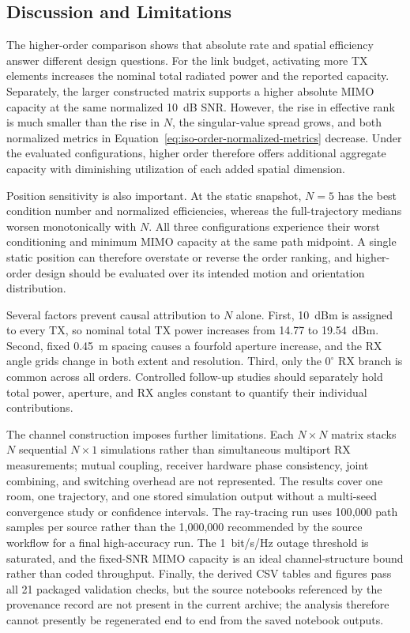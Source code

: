 \subsection{Discussion and Limitations}

The higher-order comparison shows that absolute rate and spatial efficiency answer different design questions. For the link budget, activating more TX elements increases the nominal total radiated power and the reported capacity. Separately, the larger constructed matrix supports a higher absolute MIMO capacity at the same normalized 10~dB SNR. However, the rise in effective rank is much smaller than the rise in $N$, the singular-value spread grows, and both normalized metrics in Equation~\ref{eq:iso-order-normalized-metrics} decrease. Under the evaluated configurations, higher order therefore offers additional aggregate capacity with diminishing utilization of each added spatial dimension.

Position sensitivity is also important. At the static snapshot, $N=5$ has the best condition number and normalized efficiencies, whereas the full-trajectory medians worsen monotonically with $N$. All three configurations experience their worst conditioning and minimum MIMO capacity at the same path midpoint. A single static position can therefore overstate or reverse the order ranking, and higher-order design should be evaluated over its intended motion and orientation distribution.

Several factors prevent causal attribution to $N$ alone. First, 10~dBm is assigned to every TX, so nominal total TX power increases from 14.77 to 19.54~dBm. Second, fixed 0.45~m spacing causes a fourfold aperture increase, and the RX angle grids change in both extent and resolution. Third, only the $0^\circ$ RX branch is common across all orders. Controlled follow-up studies should separately hold total power, aperture, and RX angles constant to quantify their individual contributions.

The channel construction imposes further limitations. Each $N\times N$ matrix stacks $N$ sequential $N\times1$ simulations rather than simultaneous multiport RX measurements; mutual coupling, receiver hardware phase consistency, joint combining, and switching overhead are not represented. The results cover one room, one trajectory, and one stored simulation output without a multi-seed convergence study or confidence intervals. The ray-tracing run uses 100{,}000 path samples per source rather than the 1{,}000{,}000 recommended by the source workflow for a final high-accuracy run. The 1~bit/s/Hz outage threshold is saturated, and the fixed-SNR MIMO capacity is an ideal channel-structure bound rather than coded throughput. Finally, the derived CSV tables and figures pass all 21 packaged validation checks, but the source notebooks referenced by the provenance record are not present in the current archive; the analysis therefore cannot presently be regenerated end to end from the saved notebook outputs.

